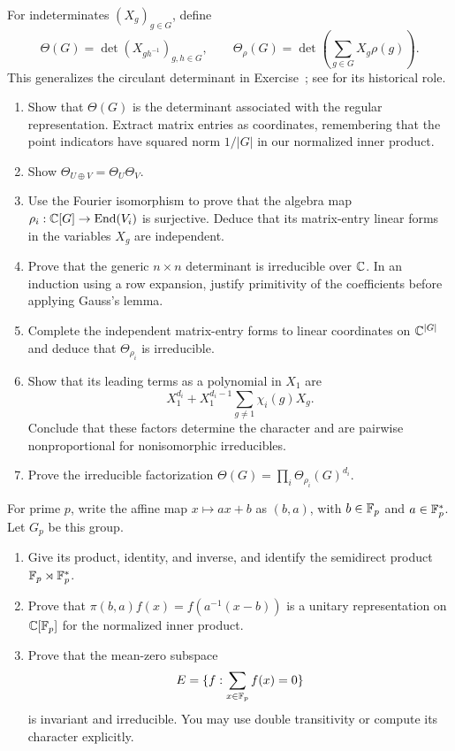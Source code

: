 \begin{exo}
\label{exo-det-groupe}\label{notation-95}\label{notation-96}
For indeterminates $(X_g)_{g\in G}$, define
\[
 \Theta(G)=\det(X_{gh^{-1}})_{g,h\in G},\qquad
 \Theta_\rho(G)=\det\!\left(\sum_{g\in G}X_g\rho(g)\right).
\]
This generalizes the circulant determinant in
Exercise~; see
\cite{lam-representation-ams-part1} for its historical role.
\begin{enumerate}
\item Show that $\Theta(G)$ is the determinant associated with the
regular representation. Extract matrix entries as coordinates, remembering
that the point indicators have squared norm $1/|G|$ in our normalized
inner product.
\item Show $\Theta_{U\oplus V}=\Theta_U\Theta_V$.
\item Use the Fourier isomorphism to prove that the algebra map
$\rho_i:\mathbb{C}[G]\to\operatorname{End}(V_i)$ is surjective. Deduce that its matrix-entry
linear forms in the variables $X_g$ are independent.
\item Prove that the generic $n\times n$ determinant is irreducible
over $\mathbb{C}$. In an induction using a row expansion, justify primitivity
of the coefficients before applying Gauss's lemma.
\item Complete the independent matrix-entry forms to linear coordinates
on $\mathbb{C}^{|G|}$ and deduce that $\Theta_{\rho_i}$ is irreducible.
\item Show that its leading terms as a polynomial in $X_1$ are
\[
 X_1^{d_i}+X_1^{d_i-1}\sum_{g\ne1}\chi_i(g)X_g.
\]
Conclude that these factors determine the character and are pairwise
nonproportional for nonisomorphic irreducibles.
\item Prove the irreducible factorization
$\Theta(G)=\prod_i\Theta_{\rho_i}(G)^{d_i}$.
\end{enumerate}
\end{exo}


\begin{exo}
\label{exo-group-affine-finite-body}
For prime $p$, write the affine map $x\mapsto ax+b$ as $(b,a)$, with
$b\in\mathbb{F}_p$ and $a\in\mathbb{F}_p^*$. Let $G_p$ be this group.
\begin{enumerate}
\item Give its product, identity, and inverse, and identify the semidirect
product $\mathbb{F}_p\rtimes\mathbb{F}_p^*$.
\item Prove that $\pi(b,a)f(x)=f(a^{-1}(x-b))$ is a unitary
representation on $\mathbb{C}[\mathbb{F}_p]$ for the normalized inner product.
\item Prove that the mean-zero subspace
\begin{equation}
\label{eq-defn-affine-space-ss-space-E}
 E=\{f:\sum_{x\in\mathbb{F}_p}f(x)=0\}
\end{equation}
is invariant and irreducible. You may use double transitivity or compute
its character explicitly.
\end{enumerate}
\end{exo}

